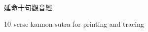 \documentclass[letterpaper]{article}
\begin{document}
	
\centering
	
	\vspace*{3cm}
	
	{
		\fontsize{70}{70}
		延命十句觀音經
	}
	
	\vspace*{1cm}
	
	{
		\Large
		10 verse kannon sutra for printing and tracing	
		
	}
	
\pagebreak
	



%
%
%
%
\end{document}
